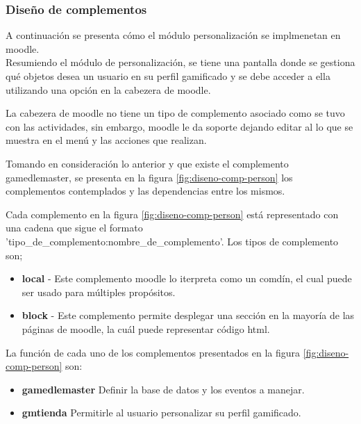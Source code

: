 

\subsubsection{Diseño de complementos}



A continuación se presenta cómo el módulo personalización
se implmenetan en moodle.\\


\noindent Resumiendo el módulo de personalización, se  tiene una pantalla donde se gestiona qué objetos
desea un usuario en su perfil gamificado
y se debe acceder a ella utilizando una opción en la cabezera de moodle.

La cabezera de moodle no tiene un tipo de complemento asociado como se tuvo con las actividades, sin embargo,
 moodle le da soporte dejando editar al 
lo que se muestra en el menú y las acciones que realizan.

\noindent Tomando en consideración lo anterior y que existe el complemento gamedlemaster, se presenta en la figura \ref{fig:diseno-comp-person}
los complementos contemplados y las dependencias entre los mismos.




Cada complemento en la figura \ref{fig:diseno-comp-person} está representado con una cadena que sigue el formato 'tipo\_de\_complemento:nombre\_de\_complemento'.
Los tipos de complemento son;
\begin{itemize}
    \item \textbf{local} -  Este complemento moodle lo iterpreta como un comdín, el cual puede ser usado para múltiples propósitos.
    \item \textbf{block} - Este complemento permite desplegar una sección en la mayoría de las páginas de moodle, la cuál puede representar código html.
\end{itemize}

La función de cada uno de los complementos presentados en la figura \ref{fig:diseno-comp-person} son:


\begin{itemize}
    \item \textbf{gamedlemaster} Definir la base de datos y los eventos a manejar.
    \item \textbf{gmtienda} Permitirle al usuario personalizar su perfil gamificado.
\end{itemize}


